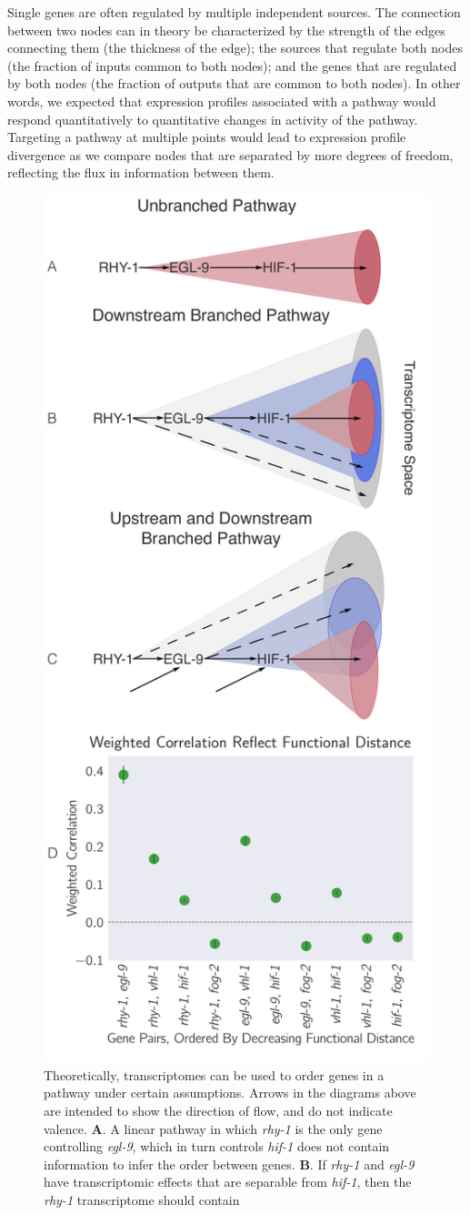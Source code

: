 \documentclass[10pt, onecolumn]{article}
\newcommand{\gene}[1]{\emph{#1}}
\begin{document}
Single genes are often regulated by multiple independent sources. The connection
between two nodes can in theory be characterized by the strength of the edges
connecting them (the thickness of the edge); the sources that regulate both
nodes (the fraction of inputs common to both nodes); and the genes that are
regulated by both nodes (the fraction of outputs that are common to both nodes).
In other words, we expected that expression profiles associated with a pathway
would respond quantitatively to quantitative changes in activity of the pathway.
Targeting a pathway at multiple points would lead to expression profile
divergence as we compare nodes that are separated by more degrees of freedom,
reflecting the flux in information between them.

\begin{figure}[tbhp]
\centering
\includegraphics[width=.4\textwidth]{../figs/decorrelation.pdf}
\caption{
Theoretically, transcriptomes can be used to order genes in a pathway under
certain assumptions. Arrows in the diagrams above are intended to show the
direction of flow, and do not indicate valence.
\textbf{A}. A linear pathway in which \gene{rhy-1} is the only gene controlling
\gene{egl-9}, which in turn controls \gene{hif-1} does not contain information
to infer the order between genes.
\textbf{B}. If \gene{rhy-1} and \gene{egl-9} have transcriptomic effects that are
separable from \gene{hif-1}, then the \gene{rhy-1} transcriptome should contain
}
\end{figure}
\end{document}
